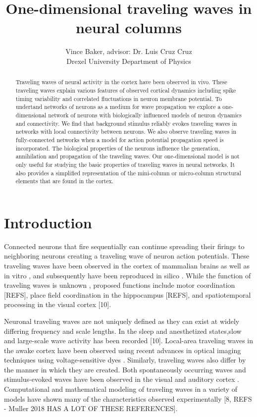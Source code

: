 \documentclass[a4paper,11pt]{article}
\title{One-dimensional traveling waves in neural columns}
\author{Vince Baker, advisor: Dr. Luis Cruz Cruz\\ Drexel University Department of Physics}
\begin{document}
\maketitle

\begin{abstract}
Traveling waves of neural activity in the cortex have been observed in vivo.
These traveling waves explain various features of observed cortical dynamics including spike timing variability and correlated fluctuations in neuron membrane potential.
To undertand networks of neurons as a medium for wave propagation we explore a one-dimensional network of neurons with biologically influenced models of neuron dynamics and connectivity.
We find that background stimulus reliably evokes traveling waves in networks with local connectivity between neurons.
We also observe traveling waves in fully-connected networks when a model for action potential propagation speed is incorporated.
The biological properties of the neurons influence the generation, annihilation and propagation of the traveling waves. 
Our one-dimensional model is not only useful for studying the basic properties of traveling waves in neural networks.
It also provides a simplified representation of the mini-column or micro-column structural elements that are found in the cortex.

\end{abstract}

\section{Introduction} 
Connected neurons that fire sequentially can continue spreading their firings to neighboring neurons creating a traveling wave of neuron action potentials. 
These traveling waves have been observed in the cortex of mammalian brains \cite{muller2018}\cite{reimer2010}  as well as in vitro \cite{wu2008}\cite{huang2004}, and subsequently have been reproduced in silico \cite{keane2015}\cite{senk2020}. 
While the function of traveling waves is unknown \cite{wu2008}\cite{muller2018}, proposed functions include motor coordination [REFS], place field coordination in the hippocampus [REFS], and spatiotemporal processing in the visual cortex [10]. 

Neuronal traveling waves are not uniquely defined as they can exist at widely differing frequency and scale lengths.  
In the sleep and anesthetized states,slow and large-scale wave activity has been recorded [10]. 
Local-area traveling waves in the awake cortex have been observed using recent advances in optical imaging techniques using voltage-sensitive dyes \cite{wu2008}\cite{shoham1999}.  
Similarly, traveling waves also differ by the manner in which they are created. 
Both spontaneously occurring waves and stimulus-evoked \cite{reimer2010} waves have been observed in the visual and auditory cortex . 
Computational and mathematical modeling of traveling waves in a variety of models have shown many of the characteristics observed experimentally \cite{ermentrout2001}[8, REFS - Muller 2018 HAS A LOT OF THESE REFERENCES].
\end{document}

